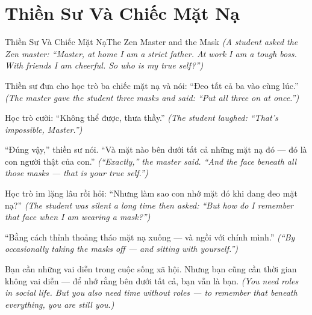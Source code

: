 \section{Thiền Sư Và Chiếc Mặt Nạ}
\begin{truyen}{Thiền Sư Và Chiếc Mặt Nạ}{The Zen Master and the Mask}
\textit{(A student asked the Zen master: ``Master, at home I am a strict father. At work I am a tough boss. With friends I am cheerful. So who is my true self?'')}

Thiền sư đưa cho học trò ba chiếc mặt nạ và nói: ``Đeo tất cả ba vào cùng lúc.''
\textit{(The master gave the student three masks and said: ``Put all three on at once.'')}

Học trò cười: ``Không thể được, thưa thầy.''
\textit{(The student laughed: ``That's impossible, Master.'')}

``Đúng vậy,'' thiền sư nói. ``Và mặt nào bên dưới tất cả những mặt nạ đó — đó là con người thật của con.''
\textit{(``Exactly,'' the master said. ``And the face beneath all those masks — that is your true self.'')}

Học trò im lặng lâu rồi hỏi: ``Nhưng làm sao con nhớ mặt đó khi đang đeo mặt nạ?''
\textit{(The student was silent a long time then asked: ``But how do I remember that face when I am wearing a mask?'')}

``Bằng cách thỉnh thoảng tháo mặt nạ xuống — và ngồi với chính mình.''
\textit{(``By occasionally taking the masks off — and sitting with yourself.'')}

\end{truyen}

\begin{baihoc}
Bạn cần những vai diễn trong cuộc sống xã hội. Nhưng bạn cũng cần thời gian không vai diễn — để nhớ rằng bên dưới tất cả, bạn vẫn là bạn.
\textit{(You need roles in social life. But you also need time without roles — to remember that beneath everything, you are still you.)}
\end{baihoc}
\ngancach


